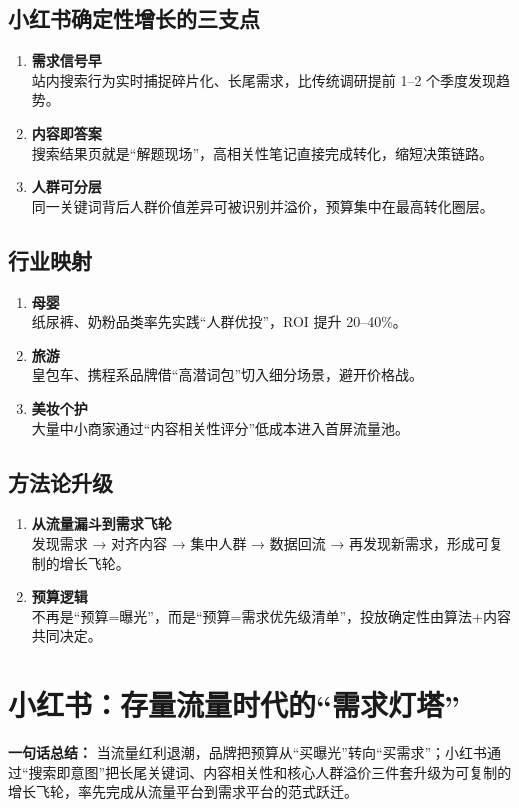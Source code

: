 \subsection{小红书确定性增长的三支点}
\begin{enumerate}[leftmargin=*, nosep]
    \item \textbf{需求信号早}  \\
    站内搜索行为实时捕捉碎片化、长尾需求，比传统调研提前 1–2 个季度发现趋势。
    \item \textbf{内容即答案}  \\
    搜索结果页就是“解题现场”，高相关性笔记直接完成转化，缩短决策链路。
    \item \textbf{人群可分层}  \\
    同一关键词背后人群价值差异可被识别并溢价，预算集中在最高转化圈层。
\end{enumerate}

\subsection{行业映射}
\begin{enumerate}[leftmargin=*, nosep]
    \item \textbf{母婴}  \\
    纸尿裤、奶粉品类率先实践“人群优投”，ROI 提升 20–40\%。
    \item \textbf{旅游}  \\
    皇包车、携程系品牌借“高潜词包”切入细分场景，避开价格战。
    \item \textbf{美妆个护}\\
    大量中小商家通过“内容相关性评分”低成本进入首屏流量池。
\end{enumerate}

\subsection{方法论升级}
\begin{enumerate}[leftmargin=*, nosep]
    \item \textbf{从流量漏斗到需求飞轮 } \\
    发现需求 → 对齐内容 → 集中人群 → 数据回流 → 再发现新需求，形成可复制的增长飞轮。
    \item \textbf{预算逻辑}  \\
    不再是“预算=曝光”，而是“预算=需求优先级清单”，投放确定性由算法+内容共同决定。
\end{enumerate}

\section{小红书：存量流量时代的“需求灯塔”}
\textbf{一句话总结：}  
当流量红利退潮，品牌把预算从“买曝光”转向“买需求”；小红书通过“搜索即意图”把长尾关键词、内容相关性和核心人群溢价三件套升级为可复制的增长飞轮，率先完成从流量平台到需求平台的范式跃迁。

